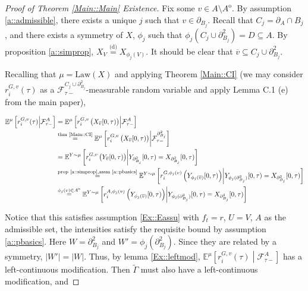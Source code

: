 \documentclass[12pt]{article}
\newcommand{\mb}{\mathbb}
\newcommand{\mc}{\mathcal}
\newcommand{\ov}{\overline}
\newcommand{\os}{\overset}
\newcommand{\te}{\text}
\newcommand{\ind}{\hspace{24pt}}
\newcommand{\exmu}[2]{\mb{E}^{#1}\left[#2\right]}	%
\newcommand{\deq}{\overset{\text{(d)}}{=}}			%
\newcommand{\neigh}[1]{\partial_{#1}}				%
\newcommand{\dneigh}[1]{\partial^2_{#1}}			%
\newcommand{\cl}[1]{\ov{#1}}						%
\newcommand{\Xf}{X}									%
\newcommand{\rate}{r}								%
\newcommand{\F}{\mc{F}}								%
\newcommand{\m}{\mu}								%
\newcommand{\vind}[1]{_{#1}}						%
\newcommand{\tme}[1]{(#1)}							%
\newcommand{\tmi}[1]{#1}							%
\newcommand{\vpara}[1]{^{#1}}						%
\newcommand{\stpara}[1]{_{#1}}						%
\newcommand{\tpara}[1]{_{#1}}						%
\newcommand{\gvpara}[2]{^{#1,#2}}					%
\newcommand{\Xg}{Y}
\newcommand{\inte}[1]{{#1}^\mathrm{o}}
\newcommand{\alt}[1]{\tilde{#1}}
\newcommand{\rt}{\tau}
\newcommand{\ratee}{\Gamma}
\newcommand{\law}{\te{Law}}
\begin{document}
\begin{proof}[Proof of Theorem \ref{Main::Main} Existence]
\ind Fix some \(v \in A\setminus \inte{A}\). By assumption \ref{a::admissible}, there exists a unique \(j\) such that \(v \in \neigh{B_j}\). Recall that \(C_j = \neigh{A}\cap B_j\), and there exists a symmetry of \(\Xf\), \(\phi_j\) such that \(\phi_j(C_j\cup\dneigh{B_j}) = D \subseteq A\). By proposition \ref{a::simprop}, \(\Xf\vind{V} \deq \Xf\vind{\phi_j(V)}\). It should be clear that \(\cl{v} \subseteq C_j\cup\dneigh{B_j}\).

\ind Recalling that \(\m = \law(\Xf)\) and applying Theorem \ref{Main::CI} (we may consider \(\rate\gvpara{G}{v}\stpara{i}\tme{\rt}\) as a \(\F\vpara{C_j\cup\dneigh{B_j}}\tpara{\rt-}\)-measurable random variable and apply Lemma C.1 (e) from the main paper),

\begin{align*}
\exmu{\m}{\rate\gvpara{G}{v}\stpara{i}\tme{\rt}\middle|\F\vpara{A}\tpara{\rt-}} &=\exmu{\m}{\rate\gvpara{G}{v}\stpara{i}\left(\Xf\vind{\cl{v}}\tmi{[0,\rt)}\right)\middle|\F\vpara{A}\tpara{\rt-}}\\
&\os{\te{thm \ref{Main::CI}}}{=} \exmu{\m}{\rate\gvpara{G}{v}\stpara{i}\left(\Xf\vind{\cl{v}}\tmi{[0,\rt)}\right)\middle|\F\vpara{\dneigh{B_j}}\tpara{\rt-}}\\
&=\exmu{\Xg\sim \m}{\rate\gvpara{G}{v}\stpara{i}\left(\Xg\vind{\cl{v}}\tmi{[0,\rt)}\right)\middle|\Xg\vind{\dneigh{B_j}}\tmi{[0,\rt)} = \Xf\vind{\dneigh{B_j}}\tmi{[0,\rt)}}\\
&\os{\te{prop \ref{a::simprop},assm \ref{a::pbasics}}}{=} \exmu{\Xg\sim \m}{\rate\gvpara{G}{\phi_j(v)}\stpara{i}\left(\Xg\vind{\phi_j(\cl{v})}\tmi{[0,\rt)}\right)\middle|\Xg\vind{\phi_j(\dneigh{B_j})}\tmi{[0,\rt)} = \Xf\vind{\dneigh{B_j}}\tmi{[0,\rt)}}\\
&\os{\phi_j(v) \in \inte{A}}{=} \exmu{\Xg\sim \m}{\rate\gvpara{A}{\phi_j(v)}\stpara{i}\left(\Xg\vind{\phi_j(\cl{v})}\tmi{[0,\rt)}\right)\middle|\Xg\vind{\phi_j(\dneigh{B_j})}\tmi{[0,\rt)} = \Xf\vind{\dneigh{B_j}}\tmi{[0,\rt)}}\\
\end{align*}

Notice that this satisfies assumption \ref{Ex::Eassu} with \(f_t = \rate\), \(U = V\), \(A\) as the admissible set, the intensities satisfy the requisite bound by assumption \ref{a::pbasics}. Here \(W = \dneigh{B_j}\) and \(W' = \phi_j(\dneigh{B_j})\). Since they are related by a symmetry, \(|W'| = |W|\). Thus, by lemma \ref{Ex::leftmod}, \(\exmu{\m}{\rate\gvpara{G}{v}\stpara{i}\tme{\rt}\middle|\F\vpara{A}\tpara{\rt-}}\) has a left-continuous modification. Then \(\alt{\ratee}\) must also have a left-continuous modification, and 


\end{proof}
\end{document}
